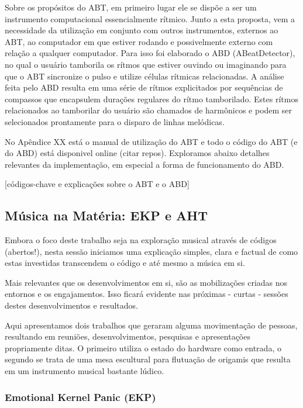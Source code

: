 Sobre os propósitos do ABT, em primeiro lugar ele se dispõe a ser um instrumento computacional
essencialmente rítmico. Junto a esta proposta, vem a necessidade da utilização em conjunto com
outros instrumentos, externos ao ABT, ao computador em que estiver rodando e possivelmente externo
com relação a qualquer computador. Para isso foi elaborado o ABD (ABeatDetector), no qual o usuário
tamborila os rítmos que estiver ouvindo ou imaginando para que o ABT sincronize o pulso e utilize
células rítmicas relacionadas. A análise feita pelo ABD resulta em uma série de rítmos explicitados
por sequências de compassos que encapsulem durações regulares do rítmo tamborilado. Estes rítmos
relacionados ao tamborilar do usuário são chamados de harmônicos e podem ser selecionados
prontamente para o disparo de linhas melódicas.

No Apêndice XX está o manual de utilização do ABT e todo o código do ABT (e do ABD) está
disponivel online (citar repos). Exploramos abaixo detalhes relevantes da implementação,
em especial a forma de funcionamento do ABD.

[códigos-chave e explicações sobre o ABT e o ABD]




  \subsection{Música na Matéria: EKP e AHT}

Embora o foco deste trabalho seja na exploração musical através de códigos (abertos!),
nesta sessão iniciamos uma explicação simples, clara e factual de como estas
investidas transcendem o código e até mesmo a música em si.

Mais relevantes que os desenvolvimentos em si, são as mobilizações criadas nos
entornos e os engajamentos. Isso ficará evidente nas próximas - curtas - sessões
destes desenvolvimentos e resultados.

Aqui apresentamos dois trabalhos que geraram alguma movimentação de pessoas,
resultando em reuniões, desenvolvimentos, pesquisas e apresentações propriamente
ditas. O primeiro utiliza o estado do hardware como entrada, o segundo se trata
de uma mesa escultural para flutuação de origamis que resulta em um instrumento musical
bastante lúdico.


      \subsubsection{Emotional Kernel Panic (EKP)}

